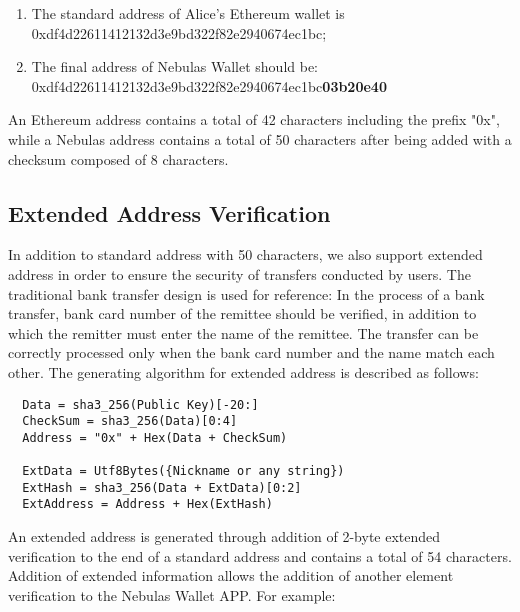 \begin{enumerate}
  \item  The standard address of Alice’s Ethereum wallet is 0xdf4d22611412132d3e9bd322f82e2940674ec1bc;
  \item  The final address of Nebulas Wallet should be: \\ 0xdf4d22611412132d3e9bd322f82e2940674ec1bc\textbf{03b20e40}
\end{enumerate}

An Ethereum address contains a total of 42 characters including the prefix "0x", while a Nebulas address contains a total of 50 characters after being added with a checksum composed of 8 characters.


\subsection{Extended Address Verification}
In addition to standard address with 50 characters, we also support extended address in order to ensure the security of transfers conducted by users. The traditional bank transfer design is used for reference: In the process of a bank transfer, bank card number of the remittee should be verified, in addition to which the remitter must enter the name of the remittee. The transfer can be correctly processed only when the bank card number and the name match each other. The generating algorithm for extended address is described as follows:


\begin{verbatim}
  Data = sha3_256(Public Key)[-20:]
  CheckSum = sha3_256(Data)[0:4]
  Address = "0x" + Hex(Data + CheckSum)

  ExtData = Utf8Bytes({Nickname or any string})
  ExtHash = sha3_256(Data + ExtData)[0:2]
  ExtAddress = Address + Hex(ExtHash)
\end{verbatim}

An extended address is generated through addition of 2-byte extended verification to the end of a standard address and contains a total of 54 characters. Addition of extended information allows the addition of another element verification to the Nebulas Wallet APP. For example:

